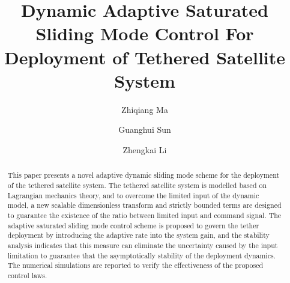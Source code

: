 \documentclass[Journal,letterpaper]{ascelike-new}
\theoremstyle{plain}
\theoremstyle{remark}
\begin{document}
\title{Dynamic Adaptive Saturated Sliding Mode Control For Deployment of Tethered Satellite System}

\author[1]{Zhiqiang Ma}
\author[2]{Guanghui Sun}
\author[3]{Zhengkai Li}


\maketitle

\begin{abstract}
This paper presents a novel adaptive dynamic sliding mode scheme for the deployment of the tethered satellite system. The tethered satellite system is modelled based on Lagrangian mechanics theory, and to overcome the limited input of the dynamic model, a new scalable dimensionless transform and strictly bounded terms are designed to guarantee the existence of the ratio between limited input and command signal. The adaptive saturated sliding mode control scheme is proposed to govern the tether deployment by introducing the adaptive rate into the system gain, and the stability analysis indicates that this measure can eliminate the uncertainty caused by the input limitation to guarantee that the asymptotically stability of the deployment dynamics. The numerical simulations are reported to verify the effectiveness of the proposed control laws.
\end{abstract}
\end{document}
